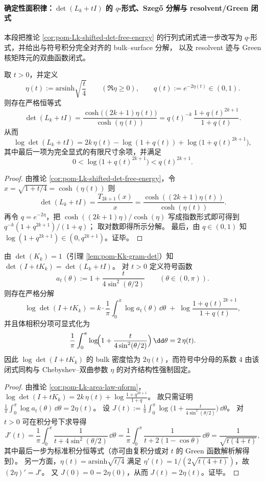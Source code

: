\paragraph{确定性面积律：\texorpdfstring{\(\det(L_k+tI)\)}{det(L_k+tI)} 的 \(q\)-形式、Szeg\H{o} 分解与 resolvent/Green 闭式}
本段把推论 \ref{cor:pom-Lk-shifted-det-free-energy} 的行列式闭式进一步改写为 \(q\)-形式，并给出与符号积分完全对齐的 bulk--surface 分解，
以及 resolvent 迹与 Green 核矩阵元的双曲函数闭式。

\begin{corollary}\label{cor:pom-Lk-area-law-qform}
取 \(t>0\)，并定义
\[
\eta(t):=\mathrm{arsinh}\sqrt{\frac{t}{4}}\qquad(\Re\eta\ge 0),
\qquad
q(t):=e^{-2\eta(t)}\in(0,1).
\]
则存在严格恒等式
\[
\det(L_k+tI)=\frac{\cosh\!\bigl((2k+1)\eta(t)\bigr)}{\cosh(\eta(t))}
=q(t)^{-k}\,\frac{1+q(t)^{2k+1}}{1+q(t)}.
\]
从而
\[
\log\det(L_k+tI)=2k\,\eta(t)-\log(1+q(t))+\log\bigl(1+q(t)^{2k+1}\bigr),
\]
其中最后一项为完全显式的有限尺寸余项，并满足
\[
0<\log\bigl(1+q(t)^{2k+1}\bigr)<q(t)^{2k+1}.
\]
\end{corollary}
\begin{proof}
由推论 \ref{cor:pom-Lk-shifted-det-free-energy}，令 \(x=\sqrt{1+t/4}=\cosh(\eta(t))\) 则
\[
\det(L_k+tI)=\frac{T_{2k+1}(x)}{x}=\frac{\cosh((2k+1)\eta(t))}{\cosh(\eta(t))}.
\]
再令 \(q=e^{-2\eta}\)，把 \(\cosh((2k+1)\eta)/\cosh(\eta)\) 写成指数形式即可得到
\(
q^{-k}(1+q^{2k+1})/(1+q)
\)；
取对数即得所示分解。
最后，由 \(q\in(0,1)\) 知 \(\log(1+q^{2k+1})\in(0,q^{2k+1})\)。证毕。
\end{proof}

\begin{proposition}[强 Szeg\H{o} 型分解的可积闭式：符号 \(a_t(\theta)=1+\frac{t}{4\sin^2(\theta/2)}\)]\label{prop:pom-Kk-strong-szego-bulk-surface}
由 \(\det(K_k)=1\)（引理 \ref{lem:pom-Kk-gram-det}）知 \(\det(I+tK_k)=\det(L_k+tI)\)。
对 \(t>0\) 定义符号函数
\[
a_t(\theta):=1+\frac{t}{4\sin^2(\theta/2)}\qquad(\theta\in(0,\pi)).
\]
则存在严格分解
\[
\log\det(I+tK_k)
=k\cdot \frac{1}{\pi}\int_{0}^{\pi}\log a_t(\theta)\,\dd\theta
\;+\;\log\frac{1+q(t)^{2k+1}}{1+q(t)},
\]
并且体相积分项可显式化为
\[
\frac{1}{\pi}\int_{0}^{\pi}\log\!\Bigl(1+\frac{t}{4\sin^2(\theta/2)}\Bigr)\,\dd\theta
=2\,\eta(t).
\]
因此 \(\log\det(I+tK_k)\) 的 bulk 密度恰为 \(2\eta(t)\)，而符号中分母的系数 \(4\) 由该闭式同构与 Chebyshev--双曲参数 \(\eta\) 的对齐结构性强制固定。
\end{proposition}
\begin{proof}
由推论 \ref{cor:pom-Lk-area-law-qform}，
\(
\log\det(I+tK_k)=2k\,\eta(t)+\log\frac{1+q^{2k+1}}{1+q}
\)。
故只需证明
\(
\frac{1}{\pi}\int_0^\pi \log a_t(\theta)\,\dd\theta=2\eta(t)
\)。
设
\(
J(t):=\frac{1}{\pi}\int_0^\pi \log\bigl(1+\frac{t}{4\sin^2(\theta/2)}\bigr)\,\dd\theta
\)。
对 \(t>0\) 可在积分号下求导得
\[
J'(t)=\frac{1}{\pi}\int_0^\pi \frac{1}{t+4\sin^2(\theta/2)}\,\dd\theta
=\frac{1}{\pi}\int_0^\pi \frac{1}{t+2(1-\cos\theta)}\,\dd\theta
=\frac{1}{\sqrt{t(4+t)}},
\]
其中最后一步为标准积分恒等式（亦可由复积分或对 \(t\) 的 Green 函数解析解得到）。
另一方面，\(\eta(t)=\mathrm{arsinh}\sqrt{t/4}\) 满足 \(\eta'(t)=1/(2\sqrt{t(4+t)})\)，故 \((2\eta)'=J'\)。
又 \(J(0)=0=2\eta(0)\)，从而 \(J(t)=2\eta(t)\)。证毕。
\end{proof}


